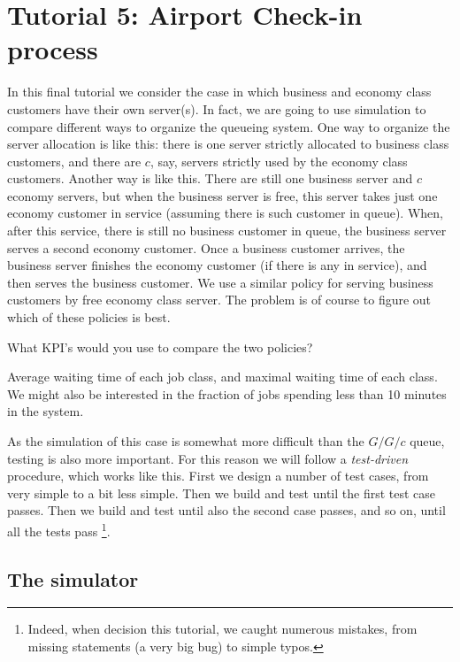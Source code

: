 \section{Tutorial 5: Airport Check-in process}
\label{sec:simul-check-proc}

In this final tutorial we consider the case in which business and economy class customers have their own server(s).
In fact, we are going to use simulation to compare different ways to organize the queueing system.
One way to organize the server allocation is like this: there is one server strictly allocated to business class customers, and there are $c$, say, servers strictly used by the economy class customers.
Another way is like this.
There are still one business server and $c$ economy servers, but when the business server is free, this server takes just one economy customer in service (assuming there is such customer in queue).
When, after this service, there is still no business customer in queue, the business server serves a second economy customer.
Once a business customer arrives, the business server finishes the economy customer (if there is any in service), and then serves the business customer.
We use a similar policy for serving business customers by free economy class server.
The problem is of course to figure out which of these policies is best.


\begin{exercise}
  What KPI's would you use to compare the two policies?
\begin{solution}
    Average waiting time of each job class, and maximal waiting time of each class.
    We might also be interested in the fraction of jobs spending less than 10 minutes in the system.
  \end{solution}
\end{exercise}

As the simulation of this case is somewhat more difficult than the $G/G/c$ queue, testing is also more important.
For this reason we will follow a \emph{test-driven} procedure, which works like this.
First we design a number of test cases, from very simple to a bit less simple.
Then we build and test until the first test case passes.
Then we build and test until also the second case passes, and so on, until all the tests pass \footnote{Indeed, when decision this tutorial, we caught numerous mistakes, from missing  statements (a very big bug) to simple typos.}.

\subsection{The simulator}
\label{sec:simulator-1}

